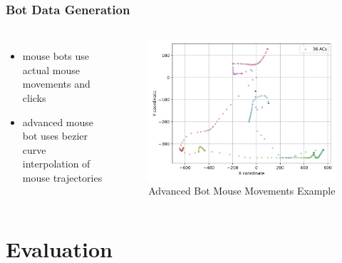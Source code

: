 \documentclass[t,aspectratio=169,table]{beamer}
\begin{document}
\begin{frame}
\frametitle{Bot Data Generation}

\begin{columns}
\begin{itemize}
    \item mouse bots use actual mouse movements and clicks
    \item advanced mouse bot uses bezier curve interpolation of mouse trajectories
\end{itemize}


\begin{figure}[h]
    \includegraphics[width=\textwidth]{figures/bot_mouse_heatmap.png}
    \caption{Advanced Bot Mouse Movements Example}
    \label{fig:bot_mouse_heatmap}
\end{figure}
\end{columns}
\end{frame}

\section{Evaluation}
\end{document}
